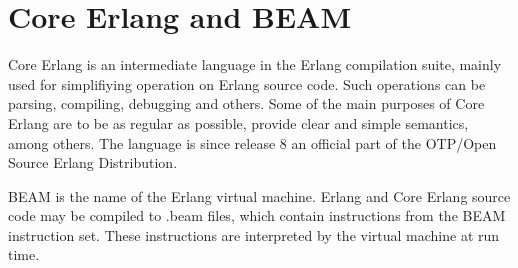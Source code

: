 \section{Core Erlang and BEAM}



Core Erlang \cite{CoreErlangIntro} is an intermediate language in the Erlang compilation suite, mainly used for simplifiying operation on Erlang source code. Such operations can be parsing, compiling, debugging and others. Some of the main purposes of Core Erlang are to be as regular as possible, provide clear and simple semantics, among others. The language is since release 8 an official part of the OTP/Open Source Erlang Distribution. 

BEAM is the name of the Erlang virtual machine. Erlang and Core Erlang source code may be compiled to .beam files, which contain instructions from the BEAM instruction set. These instructions are interpreted by the virtual machine at run time.